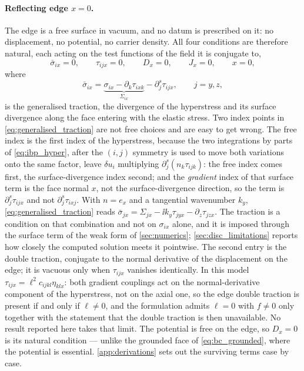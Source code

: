 \paragraph{Reflecting edge $x=0$.}  The edge is a free surface in vacuum, and no
datum is prescribed on it: no displacement, no potential, no carrier density.
All four conditions are therefore natural, each acting on the test functions of
the field it is conjugate to,
\begin{equation}
\label{eq:bc_edge}
\bar\sigma_{ix}=0,\qquad \tau_{ijx}=0,\qquad D_x=0,\qquad J_x=0,\qquad x=0 ,
\end{equation}
where
\begin{equation}
\label{eq:generalised_traction}
\bar\sigma_{ix}=\underbrace{\sigma_{ix}-\partial_k\tau_{ixk}}_{\Sigma_{ix}}
-\partial_j^{s}\tau_{ijx},\qquad j=y,z,
\end{equation}
is the generalised traction, the divergence of the hyperstress and its surface
divergence along the face entering with the elastic stress.  Two index points in
\eqref{eq:generalised_traction} are not free choices and are easy to get wrong.
The free index is the first index of the hyperstress, because the two integrations
by parts of \eqref{eq:ibp_hyper}, after the $(i,j)$ symmetry is used to move both
variations onto the same factor, leave $\delta u_i$ multiplying
$\partial_j^{s}(n_k\tau_{ijk})$: the free index comes first, the
surface-divergence index second; and the \emph{gradient} index of that surface
term is the face normal $x$, not the surface-divergence direction, so the term is
$\partial_j^s\tau_{ijx}$ and not $\partial_j^s\tau_{ixj}$.  With $n=e_x$ and a
tangential wavenumber $k_y$,
\eqref{eq:generalised_traction} reads
$\bar\sigma_{jx}=\Sigma_{jx}-\ii k_y\tau_{jyx}-\partial_z\tau_{jzx}$.
The traction is a condition on that combination and not on $\sigma_{ix}$ alone,
and it is imposed through the surface term of the weak form of
\cref{sec:numerics}; \cref{sec:disc_limitations} reports how closely the computed
solution meets it pointwise.  The second entry is the double traction, conjugate to the
normal derivative of the displacement on the edge; it is vacuous only when
$\tau_{ijx}$ vanishes identically.  In this model
$\tau_{ijx}=\ell^{2}c_{ijkl}\eta_{klx}$: both gradient couplings act on the
normal-derivative component of the hyperstress, not on the axial one, so the edge
double traction is present if and only if $\ell\neq0$, and the formulation admits
$\ell=0$ with $f\neq0$ only together with the statement that the double traction
is then unavailable.  No result reported here takes that limit.  The potential is
free on the edge, so $D_x=0$ is its natural condition --- unlike the grounded
face of \eqref{eq:bc_grounded}, where the potential is essential.
\cref{app:derivations} sets out the surviving terms case by case.

